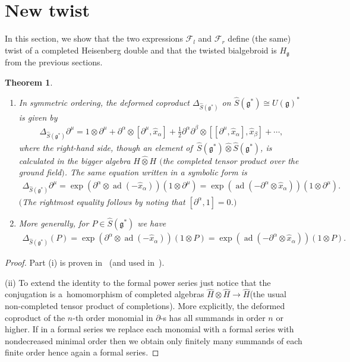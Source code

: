 \documentclass[pdftex]{sigma}
\def\gg{\mathfrak{g}}
\def\hx{\hat{x}}
\newtheorem{Theorem}{Theorem}[section]
\numberwithin{equation}{section}
\begin{document}
\section{New twist}\label{s:newtwist}

In this section, we show that the two expressions $\mathcal{F}_l$ and $\mathcal{F}_r$ define (the same) twist of a completed Heisenberg double and that the twisted bialgebroid is $H_\gg$ from the previous sections.
\begin{Theorem}\label{thm:expadDelta}\quad
\begin{enumerate}\itemsep=0pt
\item[$(i)$] In symmetric ordering, the deformed coproduct
$\Delta_{\hat{S}(\gg^*)}$ on $\hat{S}(\gg^*)\cong U(\gg)^*$ is given by
\begin{gather*}
\Delta_{\hat{S}(\gg^*)}\partial^\mu = 1\otimes\partial^\mu + \partial^\alpha\otimes[\partial^\mu,\hx_\alpha] +\tfrac{1}{2} \partial^\alpha\partial^\beta\otimes [[\partial^\mu,\hx_\alpha],\hx_\beta] +\cdots,
\end{gather*}
where the right-hand side, though an element of~$\hat{S}(\gg^*)\hat\otimes\hat{S}(\gg^*)$, is calculated in the bigger algebra $H\hat\otimes H$
$($the completed tensor product over the ground field$)$. The same equation written in a symbolic form is
\begin{gather}\label{eq:expad1}
\Delta_{\hat{S}(\gg^*)}\partial^\mu = \exp(\partial^\alpha\otimes \operatorname{ad} (-\hx_\alpha))
(1\otimes\partial^\mu) = \exp(\operatorname{ad}(-\partial^\alpha\otimes \hx_\alpha)) (1\otimes\partial^\mu).
\end{gather}
$($The rightmost equality follows by noting that $[\partial^\alpha,1] = 0$.$)$

\item[$(ii)$] More generally, for $P\in \hat{S}(\gg^*)$ we have
\begin{gather*}%
\Delta_{\hat{S}(\gg^*)} (P) = \exp(\partial^\alpha\otimes \operatorname{ad} (-\hx_\alpha))(1\otimes P) = \exp(\operatorname{ad}(-\partial^\alpha\otimes \hx_\alpha)) (1\otimes P).
\end{gather*}
\end{enumerate}
\end{Theorem}

\begin{proof} Part (i) is proven in~\cite{scopr} (and used in~\cite{heisd}).

(ii) To extend the identity to the formal power series just notice that the conjugation is a~homomorphism of completed algebras $\hat{H}\otimes\hat{H}\to\hat{H}$(the usual non-completed tensor product of completions). More explicitly, the deformed coproduct of the $n$-th order monomial in $\partial$-s has all summands in order $n$ or higher. If in a formal series we replace each monomial with a formal series with
nondecreased minimal order then we obtain only finitely many summands of each finite order hence again a formal series.
\end{proof}
\end{document}
